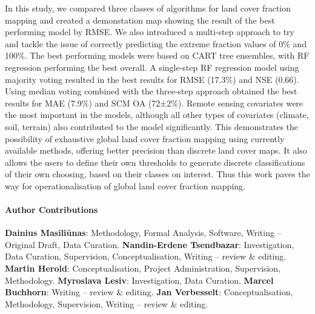 \documentclass[review,authoryear,3p]{elsarticle}
\newcommand{\minisection}[1]{\paragraph{#1}}%
\begin{document}
In this study, we compared three classes of algorithms for land cover fraction mapping and created a demonstation map showing the result of the best performing model by \gls{RMSE}.
We also introduced a multi-step approach to try and tackle the issue of correctly predicting the extreme fraction values of 0\% and 100\%.
The best performing models were based on \gls{CART} tree ensembles, with \gls{RF} regression performing the best overall.
A single-step \gls{RF} regression model using majority voting resulted in the best results for RMSE (17.3\%) and \gls{NSE} (0.66).
Using median voting combined with the three-step approach obtained the best results for \gls{MAE} (7.9\%) and \gls{SCM} \gls{OA} (72±2\%).
Remote sensing covariates were the most important in the models, although all other types of covariates (climate, soil, terrain) also contributed to the model significantly.
This demonstrates the possibility of exhaustive global land cover fraction mapping using currently available methods, offering better precision than discrete land cover maps.
It also allows the users to define their own thresholds to generate discrete classifications of their own choosing, based on their classes on interest.
Thus this work paves the way for operationalisation of global land cover fraction mapping.

\minisection{Author Contributions}
\textbf{Dainius Masiliūnas}: Methodology, Formal Analysis, Software, Writing – Original Draft, Data Curation. \textbf{Nandin-Erdene Tsendbazar}: Investigation, Data Curation, Supervision, Conceptualisation, Writing – review \& editing. \textbf{Martin Herold}: Conceptualisation, Project Administration, Supervision, Methodology. \textbf{Myroslava Lesiv}: Investigation, Data Curation. \textbf{Marcel Buchhorn}: Writing – review \& editing. \textbf{Jan Verbesselt}: Conceptualisation, Methodology, Supervision, Writing – review \& editing.

\end{document}
